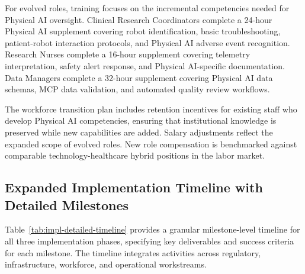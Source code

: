 For evolved roles, training focuses on the incremental competencies needed for
Physical AI oversight. Clinical Research Coordinators complete a 24-hour
Physical AI supplement covering robot identification, basic troubleshooting,
patient-robot interaction protocols, and Physical AI adverse event recognition.
Research Nurses complete a 16-hour supplement covering telemetry interpretation,
safety alert response, and Physical AI-specific documentation. Data Managers
complete a 32-hour supplement covering Physical AI data schemas, MCP data
validation, and automated quality review workflows.

The workforce transition plan includes retention incentives for existing staff
who develop Physical AI competencies, ensuring that institutional knowledge is
preserved while new capabilities are added. Salary adjustments reflect the
expanded scope of evolved roles. New role compensation is benchmarked against
comparable technology-healthcare hybrid positions in the labor market.

\subsection{Expanded Implementation Timeline with Detailed Milestones}
\label{subsec:impl-detailed-timeline}

Table~\ref{tab:impl-detailed-timeline} provides a granular milestone-level
timeline for all three implementation phases, specifying key deliverables and
success criteria for each milestone. The timeline integrates activities
across regulatory, infrastructure, workforce, and operational workstreams.

